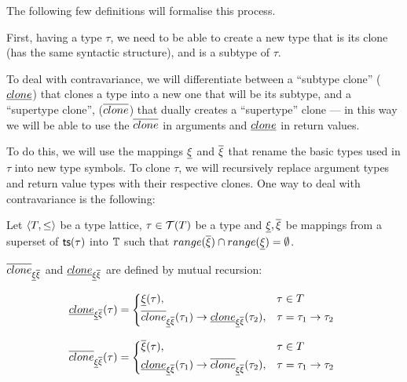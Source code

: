 \documentclass[main.tex]{subfiles}
\begin{document}
The following few definitions will formalise this process.

First, having a type $\tau$, we need to be able to create a new type
that is its clone
(has the same syntactic structure), and is a subtype of $\tau$.

To deal with contravariance, we will differentiate between a ``subtype clone''
($\underline{clone}$)
that clones a type into a new one that will be its subtype, and a
``supertype clone'', ($\overline{clone}$)
that dually creates a ``supertype'' clone --- in this way we will be able to
use the $\overline{clone}$ in arguments and $\underline{clone}$ in return
values.

To do this, we will use the mappings $\underline{\xi}$ and $\overline{\xi}$
that rename the basic types used in $\tau$ into new type symbols. To clone
$\tau$, we will recursively replace argument types and return value types
with their respective clones. One way to deal with contravariance is the following:

\newcommand\clonesub{\subtyper{clone}_{\subtyper{\xi} \suptyper{\xi}}}
\newcommand\clonesup{\suptyper{clone}_{\subtyper{\xi} \suptyper{\xi}}}

\begin{defn}
    Let $\langle  T,  \leq  \rangle$ be a type lattice, $\tau \in \mathcal{T}( T )$
    be a type and $\underline{\xi}, \overline{\xi}$ be mappings from a
    superset of
    $\mathsf{ts}(\tau)$ into $\mathbb{T}$ such that
    $range(\overline{\xi}) \cap range(\underline{\xi}) = \emptyset$.

    $\overline{clone}_{\underline{\xi} \overline{\xi}}$ and
    $\underline{clone}_{\underline{\xi} \overline{\xi}}$ are defined by
    mutual recursion:

    \[
        \subtyper{clone}_{\subtyper{\xi} \suptyper{\xi}}(\tau) =
        \begin{cases*}
            \subtyper{\xi}(\tau) ,&
                $\tau \in T$ \\
            \suptyper{clone}_{\subtyper{\xi} \suptyper{\xi}}(\tau_1)
                \tot \subtyper{clone}_{\subtyper{\xi} \suptyper{\xi}}(\tau_2) ,&
                $\tau = \tau_1 \tot \tau_2$ \\
        \end{cases*}
    \]

    \[
        \suptyper{clone}_{\subtyper{\xi} \suptyper{\xi}}(\tau) =
        \begin{cases*}
            \suptyper{\xi}(\tau) ,&
                $\tau \in T$ \\
            \subtyper{clone}_{\subtyper{\xi} \suptyper{\xi}}(\tau_1)
                \tot \suptyper{clone}_{\subtyper{\xi} \suptyper{\xi}}(\tau_2) ,&
                $\tau = \tau_1 \tot \tau_2$ \\
        \end{cases*}
    \]

\end{defn}
\end{document}
